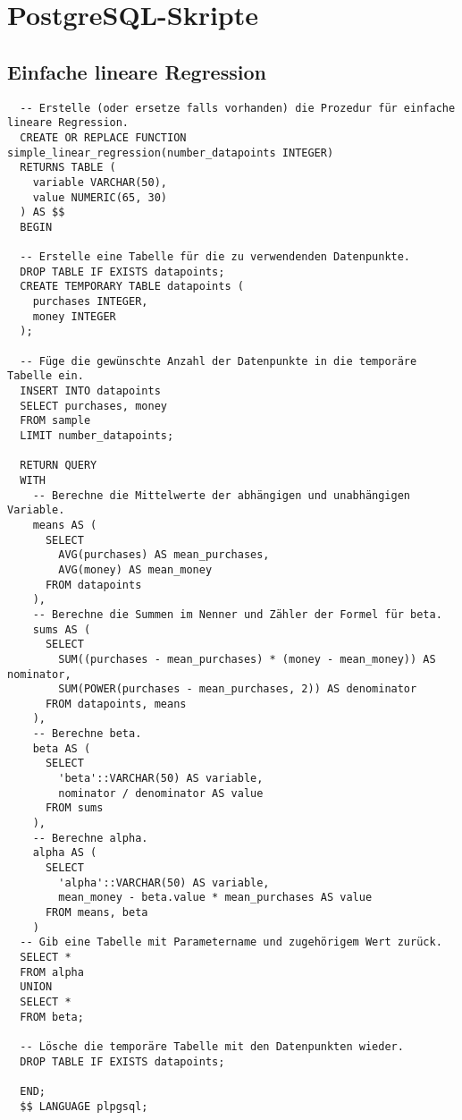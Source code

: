 \chapter{PostgreSQL-Skripte}
\label{appendix:E}

\section{Einfache lineare Regression}
\label{appendix:E:1}

\begin{verbatim}
  -- Erstelle (oder ersetze falls vorhanden) die Prozedur für einfache lineare Regression.
  CREATE OR REPLACE FUNCTION simple_linear_regression(number_datapoints INTEGER)
  RETURNS TABLE (
    variable VARCHAR(50),
    value NUMERIC(65, 30)
  ) AS $$
  BEGIN

  -- Erstelle eine Tabelle für die zu verwendenden Datenpunkte.
  DROP TABLE IF EXISTS datapoints;
  CREATE TEMPORARY TABLE datapoints (
    purchases INTEGER,
    money INTEGER
  );

  -- Füge die gewünschte Anzahl der Datenpunkte in die temporäre Tabelle ein.
  INSERT INTO datapoints
  SELECT purchases, money
  FROM sample
  LIMIT number_datapoints;

  RETURN QUERY
  WITH
    -- Berechne die Mittelwerte der abhängigen und unabhängigen Variable.
    means AS (
      SELECT
        AVG(purchases) AS mean_purchases,
        AVG(money) AS mean_money
      FROM datapoints
    ),
    -- Berechne die Summen im Nenner und Zähler der Formel für beta.
    sums AS (
      SELECT
        SUM((purchases - mean_purchases) * (money - mean_money)) AS nominator,
        SUM(POWER(purchases - mean_purchases, 2)) AS denominator
      FROM datapoints, means
    ),
    -- Berechne beta.
    beta AS (
      SELECT
        'beta'::VARCHAR(50) AS variable,
        nominator / denominator AS value
      FROM sums
    ),
    -- Berechne alpha.
    alpha AS (
      SELECT
        'alpha'::VARCHAR(50) AS variable,
        mean_money - beta.value * mean_purchases AS value
      FROM means, beta
    )
  -- Gib eine Tabelle mit Parametername und zugehörigem Wert zurück.
  SELECT *
  FROM alpha
  UNION
  SELECT *
  FROM beta;

  -- Lösche die temporäre Tabelle mit den Datenpunkten wieder.
  DROP TABLE IF EXISTS datapoints;

  END;
  $$ LANGUAGE plpgsql;
\end{verbatim}

